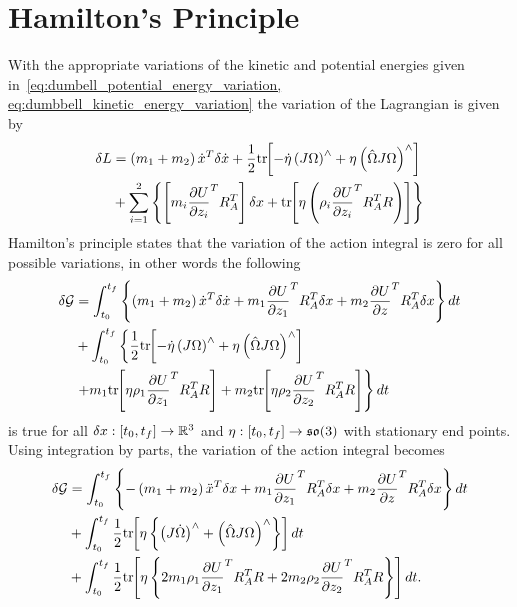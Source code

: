 \section{Hamilton's Principle}\label{sec:inertial_hamiltons_principle}
With the appropriate variations of the kinetic and potential energies given in~\cref{eq:dumbell_potential_energy_variation, eq:dumbbell_kinetic_energy_variation} the variation of the Lagrangian is given by
\begin{align}
    \delta L &= \left( m_1 + m_2 \right) \dot{x}^T \delta \dot{x} + \frac{1}{2} \mathrm{tr}\negthickspace\left[  - \dot{\eta} \left( J \Omega \right)^\wedge + \eta \left( \hat{\Omega} J \Omega \right)^\wedge \right] \\
    &+ \sum_{i=1}^2 \left\{  \left[ m_i \frac{\partial U}{\partial z_i}^T R_A^T  \right] \delta x + \mathrm{tr}\negthickspace\left[  \eta \left(  \rho_i \frac{\partial U}{\partial z_i}^T R_A^T R  \right)  \right] \right\}
\end{align}
Hamilton's principle states that the variation of the action integral is zero for all possible variations, in other words the following
\begin{align}\label{eq:inertial_hamiltons_principle_1}
    \delta \mathcal{G} &= \int_{t_0}^{t_f} \left\{  \left( m_1 + m_2 \right) \dot {x}^T \delta \dot{x} + m_1 \frac{\partial U}{\partial z_1}^T R_A^T \delta x + m_2 \frac{\partial U}{\partial z}^T R_A^T \delta x \right\} dt \nonumber \\
                       &+ \int_{t_0}^{t_f} \left\{ \frac{1}{2} \mathrm{tr}\negthickspace\left[ - \dot{\eta} \left( J \Omega \right)^\wedge + \eta \left(  \hat{\Omega} J \Omega \right)^\wedge \right] \right. \\
                       &\left.+ m_1 \mathrm{tr}\negthickspace\left[  \eta \rho_1 \frac{\partial U}{\partial z_1}^T R_A^T R \right] + m_2 \mathrm{tr}\negthickspace\left[  \eta \rho_2 \frac{\partial U}{\partial z_2}^T R_A^T R \right]\right\} dt
\end{align}
is true for all \( \delta x : \left[ t_0, t_f \right] \to \mathbb{R}^3 \) and \( \eta : \left[ t_0, t_f \right] \to \mathfrak{so}(3) \) with stationary end points.
Using integration by parts, the variation of the action integral becomes
\begin{align}\label{eq:inertial_hamiltons_principle}
    \delta \mathcal{G} &= \int_{t_0}^{t_f} \left\{  -\left( m_1 + m_2 \right) \ddot {x}^T \delta x + m_1 \frac{\partial U}{\partial z_1}^T R_A^T \delta x + m_2 \frac{\partial U}{\partial z}^T R_A^T \delta x \right\} dt \nonumber \\
                       &+ \int_{t_0}^{t_f}  \frac{1}{2} \mathrm{tr}\negthickspace\left[  \eta \left\{ \left( J \dot{\Omega} \right)^\wedge +  \left(  \hat{\Omega} J \Omega \right)^\wedge \right\} \right] dt  \nonumber\\
                       &+ \int_{t_0}^{t_f} \frac{1}{2} \mathrm{tr}\negthickspace\left[  \eta \left\{ 2 m_1 \rho_1 \frac{\partial U}{\partial z_1}^T R_A^T R+ 2 m_2 \rho_2 \frac{\partial U}{\partial z_2}^T R_A^T R \right\} \right] dt.
\end{align}
